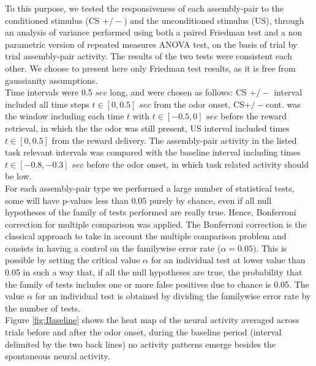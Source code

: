 To this purpose, we tested the responsiveness of each assembly-pair to the conditioned stimulus (CS $+/-$) and the unconditioned stimulus (US), through an analysis of variance performed using both a paired Friedman test and a non parametric version of repeated measures ANOVA test, on the basis of trial by trial assembly-pair activity. The results of the two tests were consistent each other. We choose to present here only Friedman test results, as it is free from gaussianity assumptions.\\Time intervals were 0.5 $sec$ long, and were chosen as follows: CS $+/-$ interval included all time steps $t \in [0, 0.5]$ $sec$ from the odor onset, CS$+/-$cont. was the window including each time $t$ with $t \in [-0.5, 0]$ $sec$ before the reward retrieval, in which the the odor was still present, US interval included times $t \in [0,0.5]$ from the reward delivery. The assembly-pair activity in the listed task relevant intervals was compared with the baseline interval including times $t \in [-0.8, -0.3]$ $sec$ before the odor onset, in which task related activity should be low.\\For each assembly-pair type we performed a large number of statistical tests, some will have p-values less than $0.05$ purely by chance, even if all null hypotheses of the family of tests performed are really true. Hence, Bonferroni correction for multiple comparison was applied. The Bonferroni correction is the classical approach to take in account the multiple comparison problem and consists in having a control on the familywise error rate ($\alpha=0.05$). This is possible by setting the critical value $\alpha$ for an individual test at lower value than 0.05 in such a way that, if all the null hypotheses are true, the probability that the family of tests includes one or more false positives due to chance is 0.05. The value $\alpha$ for an individual test is obtained by dividing the familywise error rate by the number of tests.\\Figure \ref{fig:Baseline} shows the heat map of the neural activity averaged across trials before and after the odor onset, during the baseline period (interval delimited by the two back lines) no activity patterns emerge besides the spontaneous neural activity.\\
